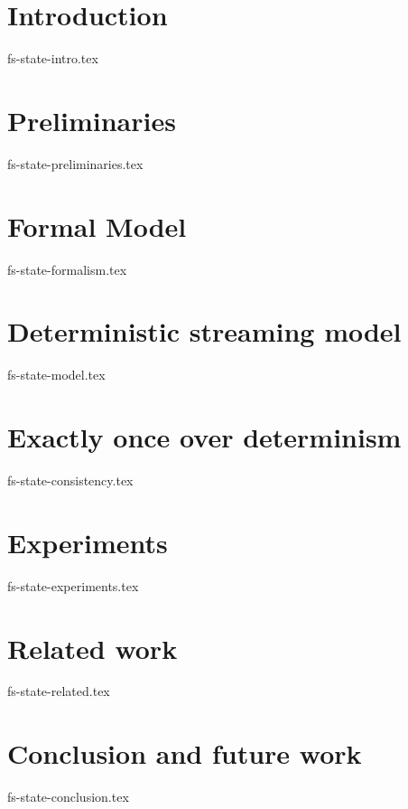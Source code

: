 \documentclass{vldb}
\theoremstyle{definition}
\begin{document}
\section {Introduction}
 {fs-state-intro.tex}

\section {Preliminaries}
 {fs-state-preliminaries.tex}

\section {Formal Model}
 {fs-state-formalism.tex}

\section {Deterministic streaming model}
 {fs-state-model.tex}

\section{Exactly once over determinism}
 {fs-state-consistency.tex}

\section {Experiments}
 {fs-state-experiments.tex}

\section {Related work}
 {fs-state-related.tex}

\section {Conclusion and future work}
 {fs-state-conclusion.tex}

\balance

%   


\end{document}
